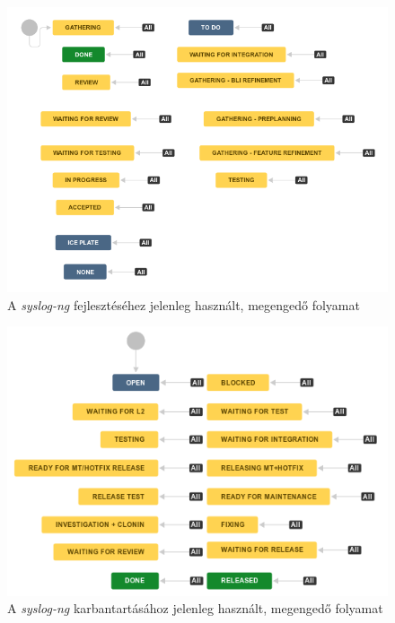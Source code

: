 \begin{figure}[h]
    \centering
    \includegraphics[width=\textwidth, height=0.4\textheight, keepaspectratio]{figures/oldfeature.png}
    \caption{A \emph{syslog-ng} fejlesztéséhez jelenleg használt, megengedő folyamat}
    \label{fig:oldfeature}
\end{figure}
\FloatBarrier
\pagebreak[3]

\begin{figure}[h]
    \includegraphics[width=\textwidth, height=0.4\textheight, keepaspectratio]{figures/oldmt.png}
    \centering
    \caption{A \emph{syslog-ng} karbantartásához jelenleg használt, megengedő folyamat}
    \label{fig:oldmt}
\end{figure}

